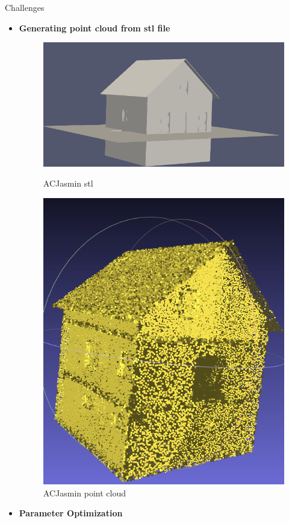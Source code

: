 \documentclass[10pt]{beamer}
\begin{document}
\begin{frame}{Challenges}
\begin{itemize}    
    \item \textbf{Generating point cloud from stl file}
\begin{figure}[H]
        \begin{minipage}[t]{0.25\textwidth}
            \includegraphics[width=\textwidth]{../../images/screen_kinetic/ACJasmin.png}
            \caption*{ACJasmin stl}
        \end{minipage}
        \begin{minipage}[t]{0.20\textwidth}
          \includegraphics[width=\textwidth]{../../images/screen_kinetic/ACJasmin_point_cloud.png}
          \caption*{ACJasmin point cloud}
        \end{minipage}
\end{figure}
    \item \textbf{Parameter Optimization}
\end{itemize}
\end{frame}
\end{document}
